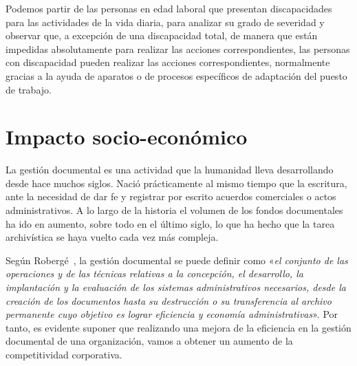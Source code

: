   Podemos partir de las personas en edad laboral que presentan discapacidades para las actividades de la vida diaria, para analizar su grado de severidad y observar que, a excepción de una discapacidad total, de manera que están impedidas absolutamente para realizar las acciones correspondientes, las personas con discapacidad pueden realizar las acciones correspondientes, normalmente gracias a la ayuda de aparatos o de procesos específicos de adaptación del puesto de trabajo.
  
  
  \section{Impacto socio-económico}
  La gestión documental es una actividad que la humanidad lleva desarrollando desde hace muchos siglos. Nació prácticamente al mismo tiempo que la escritura, ante la necesidad de dar fe y registrar por escrito acuerdos comerciales o actos administrativos. A lo largo de la historia el volumen de los fondos documentales ha ido en aumento, sobre todo en el último siglo, lo que ha hecho que la tarea archivística se haya vuelto cada vez más compleja.

Según Robergé~\cite{roberge}, la gestión documental se puede definir como «\textit{el conjunto de las operaciones y de las técnicas relativas a la concepción, el desarrollo, la implantación y la evaluación de los sistemas administrativos necesarios, desde la creación de los documentos hasta su destrucción o su transferencia al archivo permanente cuyo objetivo es lograr eficiencia y economía administrativas}». Por tanto, es evidente suponer que realizando una mejora de la eficiencia en la gestión documental de una organización, vamos a obtener un aumento de la competitividad corporativa.


